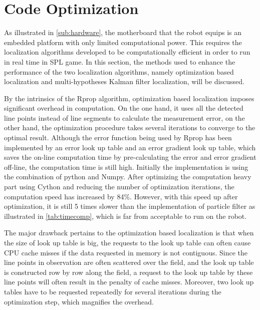 




\section{Code Optimization}
\label{sec:Optimization}
As illustrated in \autoref{sub:hardware}, the motherboard that the robot equips is an embedded platform with only limited computational power. This requires the localization algorithms developed to be computationally efficient in order to run in real time in \gls{SPL} game. In this section, the methods used to enhance the performance of the two localization algorithms, namely optimization based localization and multi-hypotheses Kalman filter localization, will be discussed.

By the intrinsics of the Rprop algorithm, optimization based localization imposes significant overhead in computation. On the one hand, it uses all the detected line points instead of line segments to calculate the measurement error, on the other hand, the optimization procedure takes several iterations to converge to the optimal result. Although the error function being used by Rprop has been implemented by an error look up table and an error gradient look up table, which saves the on-line computation time by pre-calculating the error and error gradient off-line, the computation time is still high. Initially the implementation is using the combination of python and Numpy. After optimizing the computation heavy part using Cython and reducing the number of optimization iterations, the computation speed has increased by 84\%. However, with this speed up after optimization, it is still 5 times slower than the implementation of particle filter as illustrated in \autoref{tab:timecomp}, which is far from acceptable to run on the robot.

The major drawback pertains to the optimization based localization is that when the size of look up table is big, the requests to the look up table can often cause CPU cache misses if the data requested in memory is not contiguous. Since the line points in observation are often scattered over the field, and the look up table is constructed row by row along the field, a request to the look up table by these line points will often result in the penalty of cache misses. Moreover, two look up tables have to be requested repeatedly for several iterations during the optimization step, which magnifies the overhead.

